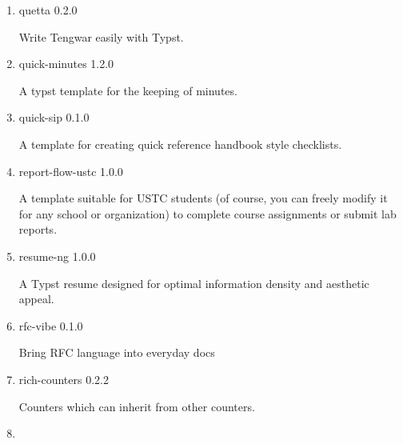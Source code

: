 \begin{enumerate}
  { qcm } { 0.1.0 }

  Qualitative Colormaps
\item
  \href{/universe/package/quetta/}{}

  { quetta } { 0.2.0 }

  Write Tengwar easily with Typst.
\item
  \href{/universe/package/quick-minutes/}{}


  { quick-minutes } { 1.2.0 }

  A typst template for the keeping of minutes.
\item
  \href{/universe/package/quick-sip/}{}


  { quick-sip } { 0.1.0 }

  A template for creating quick reference handbook style checklists.
\item
  \href{/universe/package/report-flow-ustc/}{}


  { report-flow-ustc } { 1.0.0 }

  A template suitable for USTC students (of course, you can freely
  modify it for any school or organization) to complete course
  assignments or submit lab reports.
\item
  \href{/universe/package/resume-ng/}{}


  { resume-ng } { 1.0.0 }

  A Typst resume designed for optimal information density and aesthetic
  appeal.
\item
  \href{/universe/package/rfc-vibe/}{}

  { rfc-vibe } { 0.1.0 }

  Bring RFC language into everyday docs
\item
  \href{/universe/package/rich-counters/}{}

  { rich-counters } { 0.2.2 }

  Counters which can inherit from other counters.
\item
  \href{/universe/package/riesketcher/}{}


\end{enumerate}
